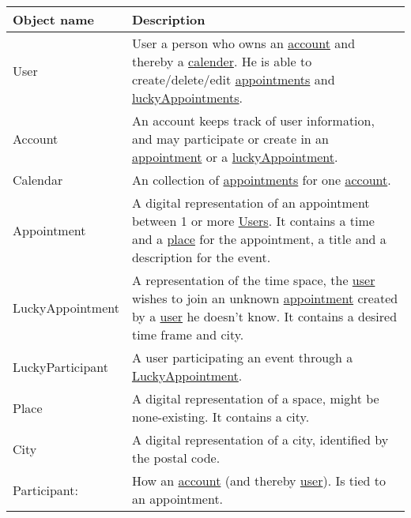 {\tabulinesep=1.2mm
\begin{tabu}{ | p{3cm} | p{13cm} |}\hline
    Object name 			& 		Description\\\hline
    User  					& 		User a person who owns an \uline{account} and thereby a \uline{calender}. He is able to create/delete/edit \uline{appointments} and  \uline{luckyAppointments}. \\\hline
    Account 				& 		An account keeps track of user information, and may participate or create in an \uline{appointment} or a \uline{luckyAppointment}. \\\hline
	Calendar				&		An collection of \uline{appointments} for one \uline{account}.\\ \hline
	Appointment				&		A digital representation of an appointment between 1 or more \uline{Users}. It contains a time and a \uline{place} for the appointment, a title and a description for the event.\\\hline
	LuckyAppointment		&		A representation of the time space, the \uline{user} wishes to join an unknown \uline{appointment} created by a \uline{user} he doesn't know. It contains a desired time frame and city.\\\hline
	LuckyParticipant		&		A user participating an event through a \uline{LuckyAppointment}.\\\hline
    Place 					& 		A digital representation of a space, might be none-existing. It contains a city.\\\hline
    City 					& 		A digital representation of a city, identified by the postal code.\\\hline
	Participant: 			&		How an \uline{account} (and thereby \uline{user}). Is tied to an appointment.\\\hline
\end{tabu}
}